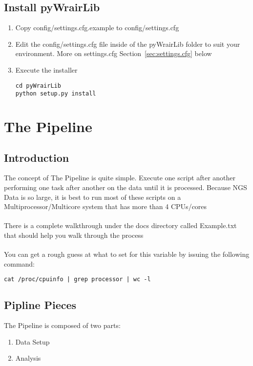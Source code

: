 \documentclass{article}
\begin{document}
\subsection{Install pyWrairLib}
\begin{enumerate}
 \item Copy config/settings.cfg.example to config/settings.cfg
 \item Edit the config/settings.cfg file inside of the pyWrairLib folder to suit your environment. More on settings.cfg Section~\ref{sec:settings.cfg} below
 \item Execute the installer
\begin{lstlisting}
cd pyWrairLib
python setup.py install
\end{lstlisting}
\end{enumerate}

\section{The Pipeline}

\subsection{Introduction}
The concept of The Pipeline is quite simple. Execute one script after another performing one task after another on the data until it is processed. Because NGS Data is so large, it is best to run most of these scripts on a Multiprocessor/Multicore system that has more than 4 CPUs/cores \\
\\
There is a complete walkthrough under the docs directory called Example.txt that should help you walk through the process \\
\\
You can get a rough guess at what to set for this variable by issuing the following command:
\begin{lstlisting}
cat /proc/cpuinfo | grep processor | wc -l
\end{lstlisting}

\subsection{Pipline Pieces}
The Pipeline is composed of two parts:
\begin{enumerate}
\item Data Setup
\item Analysis
\end{enumerate}
\end{document}
